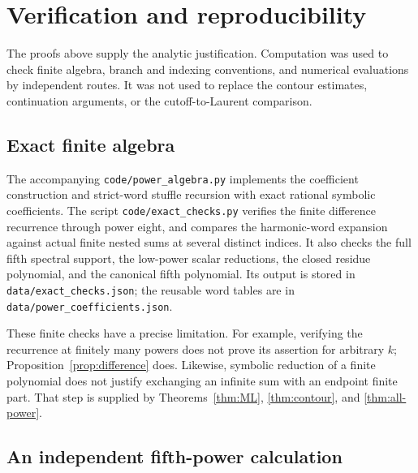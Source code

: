\section{Verification and reproducibility}
\label{sec:verification}

The proofs above supply the analytic justification.  Computation was
used to check finite algebra, branch and indexing conventions, and
numerical evaluations by independent routes.  It was not used to
replace the contour estimates, continuation arguments, or the
cutoff-to-Laurent comparison.

\subsection{Exact finite algebra}

The accompanying \texttt{code/power\_algebra.py} implements the coefficient
construction and strict-word stuffle recursion with exact rational
symbolic coefficients.  The script \texttt{code/exact\_checks.py}
verifies the finite difference recurrence through power eight, and
compares the harmonic-word expansion against actual finite nested
sums at several distinct indices.  It also checks the full fifth
spectral support, the low-power scalar reductions, the closed residue
polynomial, and the canonical fifth polynomial.  Its output is stored
in \texttt{data/exact\_checks.json}; the reusable word tables are in
\texttt{data/power\_coefficients.json}.

These finite checks have a precise limitation.  For example, verifying
the recurrence at finitely many powers does not prove its assertion
for arbitrary $k$; Proposition~\ref{prop:difference} does.  Likewise,
symbolic reduction of a finite polynomial does not justify exchanging
an infinite sum with an endpoint finite part.  That step is supplied
by Theorems~\ref{thm:ML}, \ref{thm:contour}, and \ref{thm:all-power}.

\subsection{An independent fifth-power calculation}


